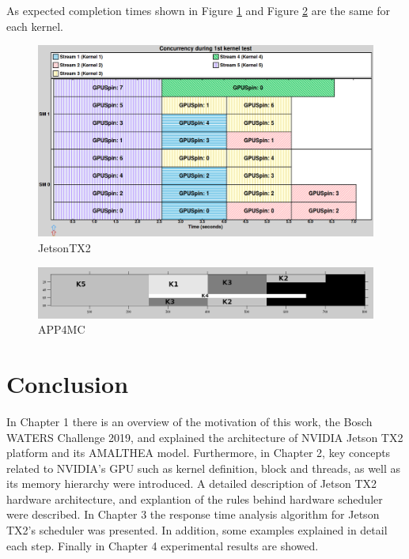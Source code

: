 \documentclass[
  12pt,
  a4paperpaper,
]{report}
\begin{document}
As expected completion times shown in Figure \ref{img:nvidia-ex07} and
Figure \ref{img:octave-ex07} are the same for each kernel.

\begin{figure}
\centering
\includegraphics[width=1\textwidth,height=\textheight]{source/figures/nvidia/ex07.png}
\caption{JetsonTX2 \label{img:nvidia-ex07}}
\end{figure}

\begin{figure}
\centering
\includegraphics[width=1\textwidth,height=\textheight]{source/figures/octave/ex07.png}
\caption{APP4MC \label{img:octave-ex07}}
\end{figure}

\hypertarget{conclusion}{%
\chapter{Conclusion}\label{conclusion}}

In Chapter 1 there is an overview of the motivation of this work, the
Bosch WATERS Challenge 2019, and explained the architecture of NVIDIA Jetson
TX2 platform and its AMALTHEA model. Furthermore, in Chapter 2, 
key concepts related to NVIDIA's GPU such as kernel
definition, block and threads, as well as its memory hierarchy were introduced.
A detailed description of Jetson TX2 hardware architecture, and explantion of the
rules behind hardware scheduler were described.
In Chapter 3 the response time analysis algorithm for Jetson TX2's scheduler was presented.
In addition, some examples  explained in detail each step. 
Finally in Chapter 4 experimental results are showed.
\end{document}
